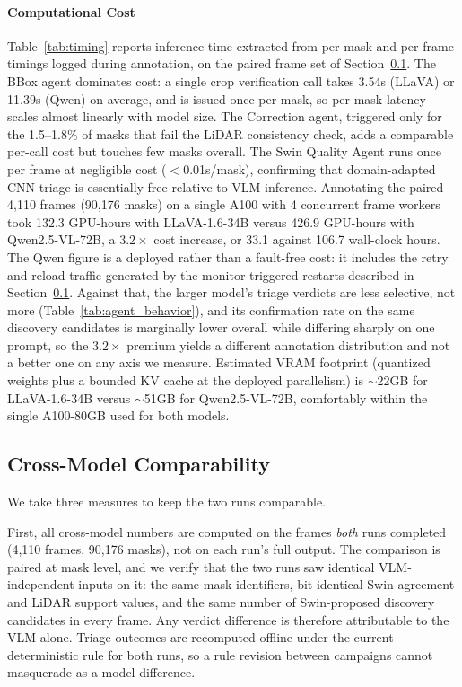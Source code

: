 \documentclass[conference]{IEEEtran}
\begin{document}
\paragraph{Computational Cost}
Table~\ref{tab:timing} reports inference time extracted from per-mask and per-frame timings logged during annotation, on the paired frame set of Section~\ref{par:comparability}.
The BBox agent dominates cost: a single crop verification call takes 3.54s (LLaVA) or 11.39s (Qwen) on average, and is issued once per mask, so per-mask latency scales almost linearly with model size.
The Correction agent, triggered only for the 1.5--1.8\% of masks that fail the LiDAR consistency check, adds a comparable per-call cost but touches few masks overall.
The Swin Quality Agent runs once per frame at negligible cost ($<$0.01s/mask), confirming that domain-adapted CNN triage is essentially free relative to VLM inference.
Annotating the paired 4{,}110 frames (90{,}176 masks) on a single A100 with 4 concurrent frame workers took 132.3 GPU-hours with LLaVA-1.6-34B versus 426.9 GPU-hours with Qwen2.5-VL-72B, a $3.2\times$ cost increase, or 33.1 against 106.7 wall-clock hours.
The Qwen figure is a deployed rather than a fault-free cost: it includes the retry and reload traffic generated by the monitor-triggered restarts described in Section~\ref{par:comparability}.
Against that, the larger model's triage verdicts are less selective, not more (Table~\ref{tab:agent_behavior}), and its confirmation rate on the same discovery candidates is marginally lower overall while differing sharply on one prompt, so the $3.2\times$ premium yields a different annotation distribution and not a better one on any axis we measure.
Estimated VRAM footprint (quantized weights plus a bounded KV cache at the deployed parallelism) is $\sim$22GB for LLaVA-1.6-34B versus $\sim$51GB for Qwen2.5-VL-72B, comfortably within the single A100-80GB used for both models.



\subsection{Cross-Model Comparability}
\label{par:comparability}
We take three measures to keep the two runs comparable.

First, all cross-model numbers are computed on the frames \emph{both} runs completed (4{,}110 frames, 90{,}176 masks), not on each run's full output.
The comparison is paired at mask level, and we verify that the two runs saw identical VLM-independent inputs on it: the same mask identifiers, bit-identical Swin agreement and LiDAR support values, and the same number of Swin-proposed discovery candidates in every frame.
Any verdict difference is therefore attributable to the VLM alone.
Triage outcomes are recomputed offline under the current deterministic rule for both runs, so a rule revision between campaigns cannot masquerade as a model difference.
\end{document}
